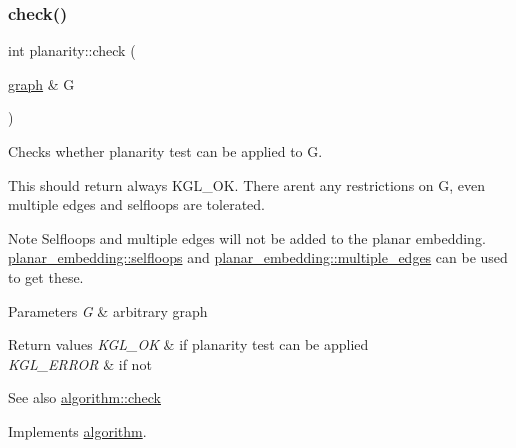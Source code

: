 \subsubsection{\texorpdfstring{check()}{check()}}
{\footnotesize\ttfamily int planarity\+::check (\begin{DoxyParamCaption}\item[{\mbox{\hyperlink{classgraph}{graph}} \&}]{G }\end{DoxyParamCaption})\hspace{0.3cm}{\ttfamily [virtual]}}



Checks whether planarity test can be applied to {\ttfamily G}. 

This should return always {\ttfamily K\+G\+L\+\_\+\+OK}. There aren\textquotesingle{}t any restrictions on {\ttfamily G}, even multiple edges and selfloops are tolerated.

\begin{DoxyNote}{Note}
Selfloops and multiple edges will not be added to the planar embedding. \mbox{\hyperlink{classplanar__embedding_ab04859be18352bc53a120b0676a499ba}{planar\+\_\+embedding\+::selfloops}} and \mbox{\hyperlink{classplanar__embedding_afb50ef8f3b5b2c6690b9d364db21f36f}{planar\+\_\+embedding\+::multiple\+\_\+edges}} can be used to get these.
\end{DoxyNote}

\begin{DoxyParams}{Parameters}
{\em G} & arbitrary graph\\
\hline
\end{DoxyParams}

\begin{DoxyRetVals}{Return values}
{\em K\+G\+L\+\_\+\+OK} & if planarity test can be applied \\
\hline
{\em K\+G\+L\+\_\+\+E\+R\+R\+OR} & if not\\
\hline
\end{DoxyRetVals}
\begin{DoxySeeAlso}{See also}
\mbox{\hyperlink{classalgorithm_a76361fb03ad1cf643affc51821e43bed}{algorithm\+::check}} 
\end{DoxySeeAlso}


Implements \mbox{\hyperlink{classalgorithm_a76361fb03ad1cf643affc51821e43bed}{algorithm}}.

\mbox{\label{classplanarity_a9ab79a340e361c3300cc08e82edd4e12}} 
